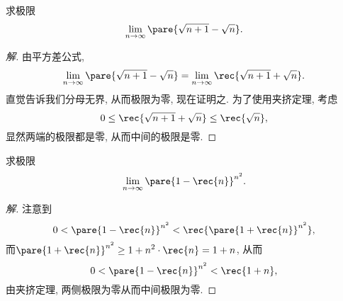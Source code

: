 \documentclass{ctexart}
\begin{document}
\begin{ex}
    求极限
    \[ \lim_{n\rightarrow\infty} \pare{\sqrt{n+1} - \sqrt{n}}. \]
\end{ex}
\begin{proof}[解]
    由平方差公式,
    \[ \lim_{n\rightarrow\infty} \pare{\sqrt{n+1} - \sqrt{n}} = \lim_{n\rightarrow\infty} \rec{\sqrt{n+1} + \sqrt{n}}. \]
    直觉告诉我们分母无界, 从而极限为零, 现在证明之. 为了使用夹挤定理, 考虑
    \[ 0 \le \rec{\sqrt{n+1} + \sqrt{n}} \le \rec{\sqrt{n}}, \]
    显然两端的极限都是零, 从而中间的极限是零.
\end{proof}
\begin{ex}
    求极限
    \[ \lim_{n\rightarrow\infty} \pare{1-\rec{n}}^{n^2}. \]
\end{ex}
\begin{proof}[解]
    注意到
    \[ 0 < \pare{1-\rec{n}}^{n^2} < \rec{\pare{1+\rec{n}}^{n^2}}, \]
    而$\displaystyle \pare{1+\rec{n}}^{n^2} \ge 1 + n^2\cdot \rec{n} = 1+n$,
    从而
    \[ 0 < \pare{1-\rec{n}}^{n^2} < \rec{1+n}, \]
    由夹挤定理, 两侧极限为零从而中间极限为零.
\end{proof}
\end{document}
